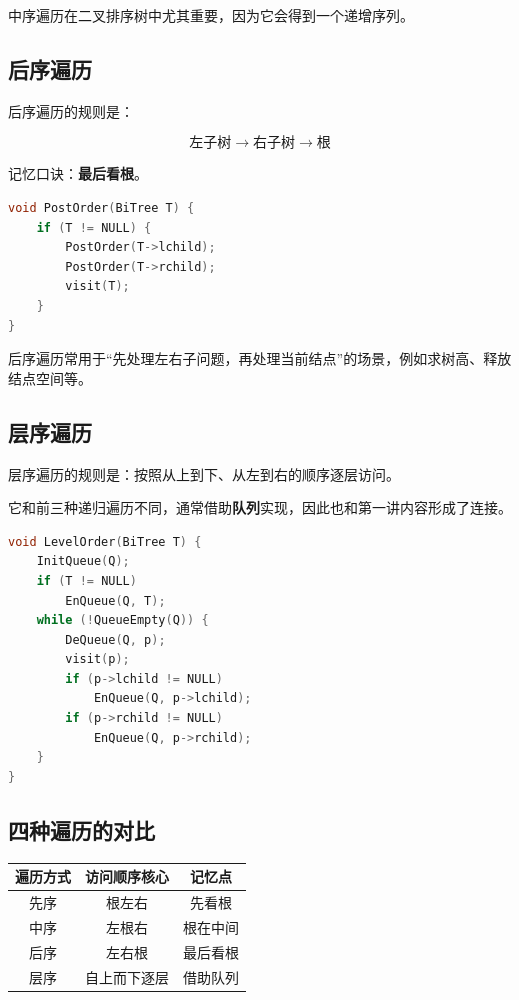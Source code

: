 \documentclass{../../note}
\begin{document}
中序遍历在二叉排序树中尤其重要，因为它会得到一个递增序列。

\subsection{后序遍历}

后序遍历的规则是：

\[
\text{左子树} \rightarrow \text{右子树} \rightarrow \text{根}
\]

记忆口诀：\textbf{最后看根}。

\begin{lstlisting}[language=C]
void PostOrder(BiTree T) {
    if (T != NULL) {
        PostOrder(T->lchild);
        PostOrder(T->rchild);
        visit(T);
    }
}
\end{lstlisting}

后序遍历常用于“先处理左右子问题，再处理当前结点”的场景，例如求树高、释放结点空间等。

\subsection{层序遍历}

层序遍历的规则是：按照从上到下、从左到右的顺序逐层访问。

它和前三种递归遍历不同，通常借助\textbf{队列}实现，因此也和第一讲内容形成了连接。

\begin{lstlisting}[language=C]
void LevelOrder(BiTree T) {
    InitQueue(Q);
    if (T != NULL)
        EnQueue(Q, T);
    while (!QueueEmpty(Q)) {
        DeQueue(Q, p);
        visit(p);
        if (p->lchild != NULL)
            EnQueue(Q, p->lchild);
        if (p->rchild != NULL)
            EnQueue(Q, p->rchild);
    }
}
\end{lstlisting}

\subsection{四种遍历的对比}

\begin{center}
\begin{tabular}{|c|c|c|}
\hline
遍历方式 & 访问顺序核心 & 记忆点 \\
\hline
先序 & 根左右 & 先看根 \\
\hline
中序 & 左根右 & 根在中间 \\
\hline
后序 & 左右根 & 最后看根 \\
\hline
层序 & 自上而下逐层 & 借助队列 \\
\hline
\end{tabular}
\end{center}
\end{document}
